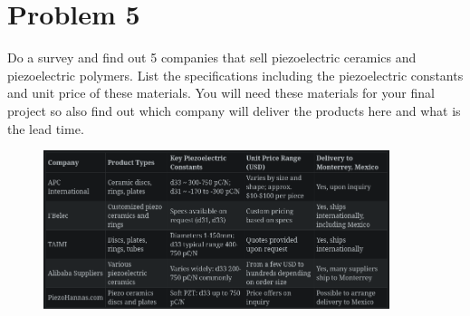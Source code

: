 \documentclass[../main.tex]{subfiles}
\begin{document}
\newpage

\section{Problem 5}

Do a survey and find out 5 companies that sell piezoelectric ceramics and piezoelectric polymers. 
List the specifications including the piezoelectric constants and unit price of these materials. 
You will need these materials for your final project so also find out which company will deliver the products here and what is the lead time.

\begin{figure}[ht!]
    \centering
    \includegraphics[width=0.9\textwidth]{../imgs/table.png}
\end{figure}
\end{document}
